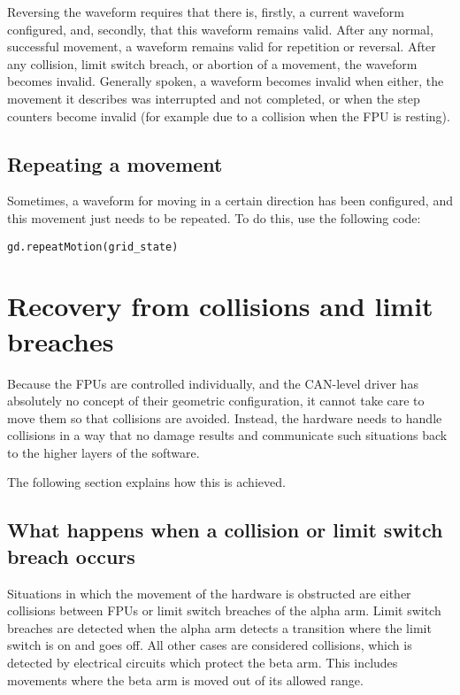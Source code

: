 \documentclass{scrartcl}[12pt,a4paper]
\begin{document}
Reversing the waveform requires that there is, firstly, a current
waveform configured, and, secondly, that this waveform remains valid.
After any normal, successful movement, a waveform remains valid for
repetition or reversal. After any collision, limit switch breach, or
abortion of a movement, the waveform becomes invalid. Generally
spoken, a waveform becomes invalid when either, the movement it
describes was interrupted and not completed, or when the step counters
become invalid (for example due to a collision when the FPU is
resting).


\subsection{Repeating a movement}

Sometimes, a waveform for moving in a certain direction has been
configured, and this movement just needs to be repeated.  To do this,
use the following code:

\begin{verbatim}
gd.repeatMotion(grid_state)
\end{verbatim}


\section{Recovery from collisions and limit breaches}
\label{sec:recovery}

Because the FPUs are controlled individually, and the CAN-level driver
has absolutely no concept of their geometric configuration, it cannot
take care to move them so that collisions are avoided.  Instead, the
hardware needs to handle collisions in a way that no damage results
and communicate such situations back to the higher layers of the
software.

The following section explains how this is achieved.

\subsection{What happens when a collision or limit switch breach occurs}

Situations in which the movement of the hardware is obstructed
are either collisions between FPUs or limit switch breaches
of the alpha arm. Limit switch breaches are detected
when the alpha arm detects a transition where the
limit switch is on and goes off. All other cases are
considered collisions, which is detected by electrical
circuits which protect the beta arm. This includes
movements where the beta arm is moved out of its
allowed range.
\end{document}
